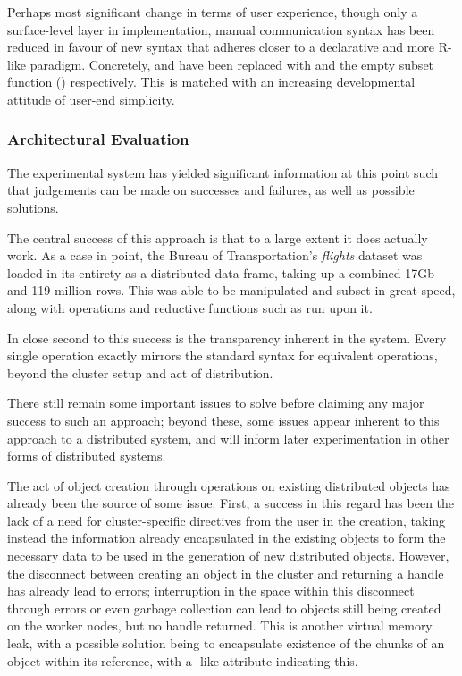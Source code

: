 Perhaps most significant change in terms of user experience, though only a surface-level layer in implementation, manual communication syntax has been reduced in favour of new syntax that adheres closer to a declarative and more R-like paradigm.
Concretely,  and  have been replaced with  and the empty subset function () respectively.
This is matched with an increasing developmental attitude of user-end simplicity.

\subsubsection{Architectural Evaluation}\label{sec:eval}

The experimental system has yielded significant information at this point such that judgements can be made on successes and failures, as well as possible solutions.

The central success of this approach is that to a large extent it does actually work.
As a case in point, the Bureau of Transportation's \emph{flights} \cite{bot2009flights} dataset was loaded in its entirety as a distributed data frame, taking up a combined 17Gb and 119 million rows.
This was able to be manipulated and subset in great speed, along with operations and reductive functions such as  run upon it.

In close second to this success is the transparency inherent in the system.
Every single operation exactly mirrors the standard \R{} syntax for equivalent operations, beyond the cluster setup and act of distribution.

There still remain some important issues to solve before claiming any major success to such an approach; beyond these, some issues appear inherent to this approach to a distributed system, and will inform later experimentation in other forms of distributed systems.

The act of object creation through operations on existing distributed objects has already been the source of some issue.
First, a success in this regard has been the lack of a need for cluster-specific directives from the user in the creation, taking instead the information already encapsulated in the existing objects to form the necessary data to be used in the generation of new distributed objects.
However, the disconnect between creating an object in the cluster and returning a handle has already lead to errors; interruption in the space within this disconnect through errors or even garbage collection can lead to objects still being created on the worker nodes, but no handle returned.
This is another virtual memory leak, with a possible solution being to encapsulate existence of the chunks of an object within its reference, with a -like  attribute indicating this.

